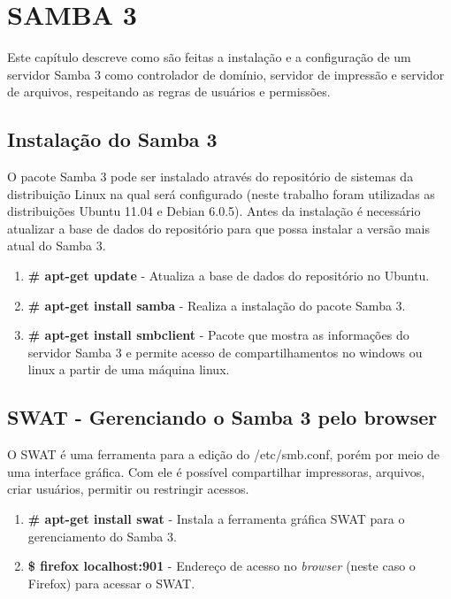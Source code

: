 \chapter{SAMBA 3}
Este capítulo descreve como são feitas a instalação e a configuração de um servidor Samba 3 como controlador de domínio, servidor de impressão e servidor de arquivos, respeitando as regras de usuários e permissões.

\section{Instalação do Samba 3}

O pacote Samba 3 pode ser instalado através do repositório de sistemas da distribuição Linux na qual será configurado (neste trabalho foram utilizadas as distribuições Ubuntu 11.04 e Debian 6.0.5). Antes da instalação é necessário atualizar a base de dados do repositório para que possa instalar a versão mais atual do Samba 3.
 
\begin{enumerate}
    \item \textbf{\# apt-get update} - Atualiza a base de dados do repositório no Ubuntu.
    \item \textbf{\# apt-get install samba} - Realiza a instalação do pacote Samba 3.
    \item \textbf{\# apt-get install smbclient} - Pacote que mostra as informações do servidor Samba 3 e permite acesso de compartilhamentos no windows ou linux a partir de uma máquina linux.
\end{enumerate}

\section{SWAT - Gerenciando o Samba 3 pelo browser}

O SWAT é uma ferramenta para a edição do /etc/smb.conf, porém por meio de uma interface gráfica. Com ele é possível compartilhar impressoras, arquivos, criar usuários, permitir ou restringir acessos.

\begin{enumerate}
 \item \textbf{\# apt-get install swat} - Instala a ferramenta gráfica SWAT para o gerenciamento do Samba 3.
    \item \textbf{\$ firefox localhost:901} - Endereço de acesso no \textit{browser} (neste caso o Firefox) para acessar o SWAT.
\end{enumerate}

